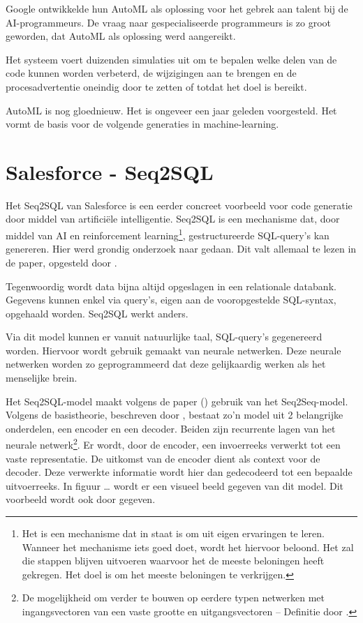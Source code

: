 Google ontwikkelde hun AutoML als oplossing voor het gebrek aan talent bij de AI-programmeurs. De vraag naar gespecialiseerde programmeurs is zo groot geworden, dat AutoML als oplossing werd aangereikt. 

Het systeem voert duizenden simulaties uit om te bepalen welke delen van de code kunnen worden verbeterd, de wijzigingen aan te brengen en de procesadvertentie oneindig door te zetten of totdat het doel is bereikt. 
 
AutoML is nog gloednieuw. Het is ongeveer een jaar geleden voorgesteld. Het vormt de basis voor de volgende generaties in machine-learning.

\section{Salesforce - Seq2SQL}
\label{sec:Salesforce - Seq2SQL}

Het Seq2SQL van Salesforce is een eerder concreet voorbeeld voor code generatie door middel van artificiële intelligentie. Seq2SQL is een mechanisme dat, door middel van AI en reinforcement learning\footnote{Het is een mechanisme dat in staat is om uit eigen ervaringen te leren. Wanneer het mechanisme iets goed doet, wordt het hiervoor beloond. Het zal die stappen blijven uitvoeren waarvoor het de meeste beloningen heeft gekregen. Het doel is om het meeste beloningen te verkrijgen.}, gestructureerde SQL-query’s kan genereren. Hier werd grondig onderzoek naar gedaan. Dit valt allemaal te lezen in de paper, opgesteld door \textcite{seq2sqlPaper}.

Tegenwoordig wordt data bijna altijd opgeslagen in een relationale databank. Gegevens kunnen enkel via query’s, eigen aan de vooropgestelde SQL-syntax, opgehaald worden. Seq2SQL werkt anders.

Via dit model kunnen er vanuit natuurlijke taal, SQL-query’s gegenereerd worden. Hiervoor wordt gebruik gemaakt van neurale netwerken. Deze neurale netwerken worden zo geprogrammeerd dat deze gelijkaardig werken als het menselijke brein. 

Het Seq2SQL-model maakt volgens de paper (\textcite{seq2sqlPaper}) gebruik van het Seq2Seq-model. Volgens de basistheorie, beschreven door \textcite{drnn}, bestaat zo’n model uit 2 belangrijke onderdelen, een encoder en een decoder. Beiden zijn recurrente lagen van het neurale netwerk\footnote{De mogelijkheid om verder te bouwen op eerdere typen netwerken met ingangsvectoren van een vaste grootte en uitgangsvectoren – Definitie door \textcite{rnn}.}. Er wordt, door de encoder, een invoerreeks verwerkt tot een vaste representatie. De uitkomst van de encoder dient als context voor de decoder. Deze verwerkte informatie wordt hier dan gedecodeerd tot een bepaalde uitvoerreeks. In figuur … wordt er een visueel beeld gegeven van dit model. Dit voorbeeld wordt ook door \textcite{drnn} gegeven.

